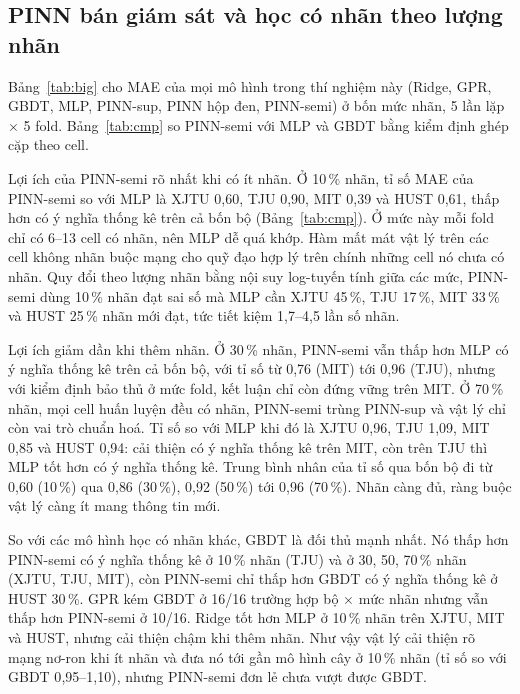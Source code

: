 

\subsection{PINN bán giám sát và học có nhãn theo lượng nhãn}\label{sec:labels}

Bảng~\ref{tab:big} cho MAE của mọi mô hình trong thí nghiệm này (Ridge, GPR, GBDT, MLP, PINN-sup, PINN hộp đen,
PINN-semi) ở bốn mức nhãn, 5 lần lặp $\times$ 5 fold. Bảng~\ref{tab:cmp} so PINN-semi với MLP và GBDT bằng kiểm định ghép
cặp theo cell.



Lợi ích của PINN-semi rõ nhất khi có ít nhãn. Ở 10\,\% nhãn, tỉ số MAE của PINN-semi so với MLP là XJTU 0{,}60, TJU 0{,}90,
MIT 0{,}39 và HUST 0{,}61, thấp hơn có ý nghĩa thống kê trên cả bốn bộ (Bảng~\ref{tab:cmp}). Ở mức này mỗi fold chỉ có
6--13 cell có nhãn, nên MLP dễ quá khớp. Hàm mất mát vật lý trên các cell không nhãn buộc mạng cho quỹ đạo hợp lý trên
chính những cell nó chưa có nhãn. Quy đổi theo lượng nhãn bằng nội suy log-tuyến tính giữa các mức, PINN-semi dùng
10\,\% nhãn đạt sai số mà MLP cần XJTU 45\,\%, TJU 17\,\%, MIT 33\,\% và HUST 25\,\% nhãn mới đạt, tức tiết kiệm 1{,}7--4{,}5
lần số nhãn.

Lợi ích giảm dần khi thêm nhãn. Ở 30\,\% nhãn, PINN-semi vẫn thấp hơn MLP có ý nghĩa thống kê trên cả bốn bộ, với tỉ số từ
0{,}76 (MIT) tới 0{,}96 (TJU), nhưng với kiểm định bảo thủ ở mức fold, kết luận chỉ còn đứng vững trên MIT. Ở 70\,\% nhãn,
mọi cell huấn luyện đều có nhãn, PINN-semi trùng PINN-sup và vật lý chỉ còn vai trò chuẩn hoá. Tỉ số so với MLP khi đó là
XJTU 0{,}96, TJU 1{,}09, MIT 0{,}85 và HUST 0{,}94: cải thiện có ý nghĩa thống kê trên MIT, còn trên TJU thì MLP tốt hơn có ý
nghĩa thống kê. Trung bình nhân của tỉ số qua bốn bộ đi từ 0{,}60 (10\,\%) qua 0{,}86 (30\,\%), 0{,}92 (50\,\%) tới 0{,}96
(70\,\%). Nhãn càng đủ, ràng buộc vật lý càng ít mang thông tin mới.

So với các mô hình học có nhãn khác, GBDT là đối thủ mạnh nhất. Nó thấp hơn PINN-semi có ý nghĩa thống kê ở 10\,\% nhãn
(TJU) và ở 30, 50, 70\,\% nhãn (XJTU, TJU, MIT), còn PINN-semi chỉ thấp hơn GBDT có ý nghĩa thống kê ở HUST 30\,\%. GPR kém
GBDT ở 16/16 trường hợp bộ $\times$ mức nhãn nhưng vẫn thấp hơn PINN-semi ở 10/16. Ridge tốt hơn MLP ở 10\,\% nhãn trên
XJTU, MIT và HUST, nhưng cải thiện chậm khi thêm nhãn. Như vậy vật lý cải thiện rõ mạng nơ-ron khi ít nhãn và đưa nó tới
gần mô hình cây ở 10\,\% nhãn (tỉ số so với GBDT 0{,}95--1{,}10), nhưng PINN-semi đơn lẻ chưa vượt được GBDT.

